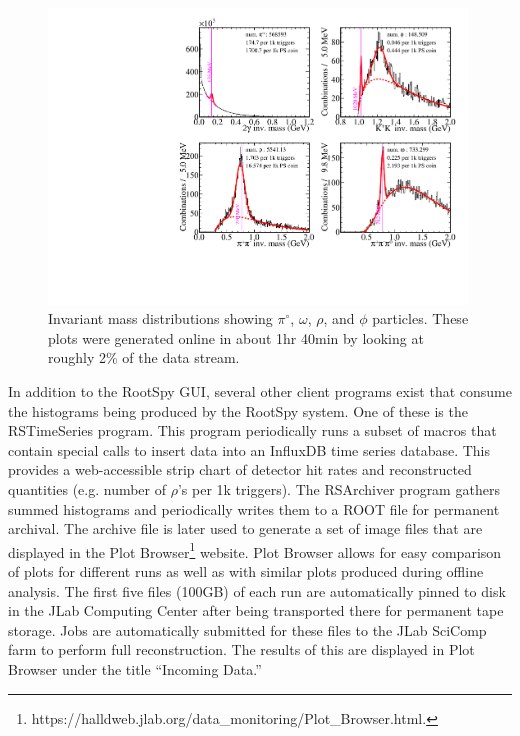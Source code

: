\begin{figure}[tbp]
\begin{center}
\includegraphics[width=0.99\textwidth]{figures/online_monitoring_PID.pdf}
\caption{\label{fig:online_monitoring_PID}Invariant mass distributions showing $\pi^\circ$, $\omega$, $\rho$, and $\phi$ particles. These plots were generated online in about 1hr 40min by looking at roughly 2\% of the data stream.}   
\end{center}  
\end{figure}

In addition to the RootSpy GUI, several other client programs exist that consume the histograms being produced by the RootSpy system. One of these is the RSTimeSeries program. This program periodically runs a subset of macros that contain special calls to insert data into an InfluxDB time series database. This provides a web-accessible strip chart of detector hit rates and reconstructed quantities (e.g. number of $\rho$'s per 1k triggers). The RSArchiver program gathers summed histograms and periodically writes them to a ROOT file for permanent archival. The archive file is later used to generate a set of image files that are displayed in the Plot Browser\footnote{https://halldweb.jlab.org/data\_monitoring/Plot\_Browser.html.} website. Plot Browser allows for easy comparison of plots for different runs as well as with similar plots produced during offline analysis. The first five files (100GB) of each run are automatically pinned to disk in the JLab Computing Center after being transported there for permanent tape storage. Jobs are automatically submitted for these files to the JLab SciComp farm to perform full reconstruction. The results of this are displayed in Plot Browser under the title ``Incoming Data.''


